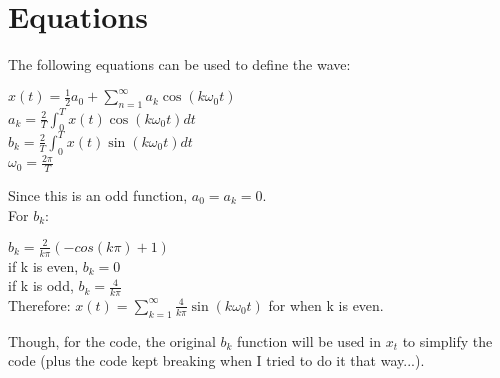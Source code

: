 \documentclass[12pt,a4paper]{article}
\begin{document}
\section{Equations}
The following equations can be used to define the wave:
\begin{center}
    $x(t)=\frac{1}{2}a_0+\sum_{n=1}^{\infty}a_k\cos{(k\omega_0t)}$\\
    $a_k=\frac{2}{T}\int_{0}^{T}x(t)\cos{(k\omega_0t)}dt$\\
    $b_k=\frac{2}{T}\int_{0}^{T}x(t)\sin{(k\omega_0t)}dt$\\
    $\omega_0=\frac{2\pi}{T}$
\end{center}
Since this is an odd function, $a_0=a_k=0$.\\
For $b_k$:
\begin{center}
    $b_k=\frac{2}{k\pi}(-cos(k\pi)+1)$\\
    if k is even, $b_k=0$\\
    if k is odd, $b_k=\frac{4}{k\pi}$\\
    Therefore: $x(t)=\sum_{k=1}^{\infty}\frac{4}{k\pi}\sin{(k\omega_0t)}$ for when k is even.
\end{center}
Though, for the code, the original $b_k$ function will be used in $x_t$ to simplify the code (plus the code kept breaking when I tried to do it that way...).\\
\end{document}
